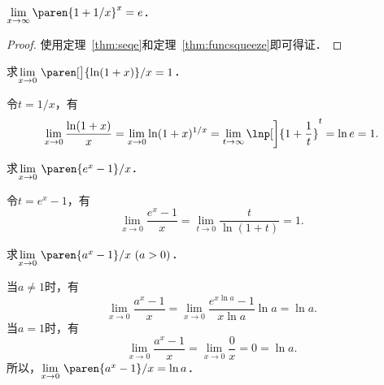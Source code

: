 \begin{theorem*}
  \(\lim\limits_{x\to\infty} \paren{1 + 1/x}^x = e\)． %

  \begin{proof}
    使用定理~\ref{thm:seqe}和定理~\ref{thm:funcsqueeze}即可得证．
  \end{proof}
\end{theorem*}

\begin{example*}
  求\(\lim\limits_{x\to0} \,\paren[\big]{\ln(1+x)}/{x} = 1\)． %

  \begin{remark}
    令\(t = 1/x\)，有
    \begin{equation*}
      \lim_{x\to0} \frac{\ln(1+x)}{x}
      = \lim_{x\to0} \ln(1+x)^{1/x}
      = \lim_{t\to\infty} \lnp[\bigg]{1 + \frac1t}^t
      = \ln e
      = 1.
    \end{equation*}
  \end{remark}
\end{example*}

\begin{example*}
  求\(\lim\limits_{x\to0} \,\paren{e^x-1}/{x}\)．

  \begin{remark}
    令\(t = e^x - 1\)，有
    \begin{equation*}
      \lim_{x\to0} \frac{e^x-1}{x}
      = \lim_{t\to0} \frac{t}{\ln(1+t)}
      = 1.
    \end{equation*}
  \end{remark}
\end{example*}

\begin{example*}
  求\(\lim\limits_{x\to0} \,\paren{a^x-1}/{x}\ (a > 0)\)．

  \begin{remark}
    当\(a \ne 1\)时，有
    \begin{equation*}
      \lim_{x\to0} \frac{a^x-1}{x}
      = \lim_{x\to0} \frac{e^{x \ln a}-1}{x \ln a} \ln a
      = \ln a.
    \end{equation*}
    当\(a = 1\)时，有
    \begin{equation*}
      \lim_{x\to0} \frac{a^x-1}{x}
      = \lim_{x\to0} \frac{0}{x}
      = 0 = \ln a.
    \end{equation*}
    所以，\(\lim\limits_{x\to0} \,\paren{a^x-1}/{x} = \ln a\)．
  \end{remark}
\end{example*}


